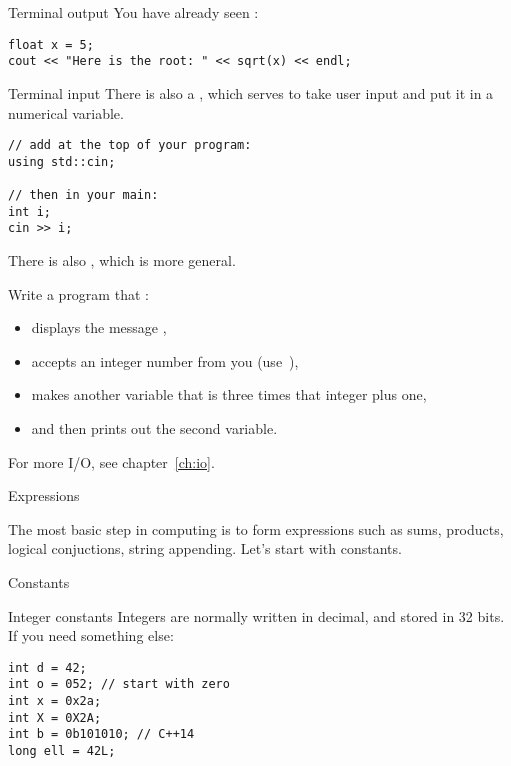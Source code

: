 \begin{block}{Terminal output}
  \label{sl:cout}
You have already seen :
\begin{lstlisting}
float x = 5;
cout << "Here is the root: " << sqrt(x) << endl;
\end{lstlisting}
\end{block}

\begin{block}{Terminal input}
  \label{sl:cin}
  There is also a , which serves to take user input and
  put it in a numerical variable.
\begin{lstlisting}
// add at the top of your program:
using std::cin;

// then in your main:
int i;
cin >> i;
\end{lstlisting}
There is also , which is more general.
\end{block}

\begin{exercise}
  \label{ex:cin-cout3np1}
  Write a program that :
  \begin{itemize}
  \item displays the message ,
  \item accepts an integer number from you (use~),
  \item makes another variable that is three times that integer plus one,
  \item and then prints out the second variable.
  \end{itemize}
\end{exercise}

For more I/O, see chapter~\ref{ch:io}.

 {Expressions}
\label{sec:expr}

The most basic step in computing is to form expressions such as sums,
products, logical conjuctions, string appending. Let's start with
constants.

 {Constants}

\begin{block}{Integer constants}
  \label{sl:intvals}
  Integers are normally  written in decimal, and stored in 32 bits.
  If you need something else:
\begin{lstlisting}
int d = 42;
int o = 052; // start with zero
int x = 0x2a;
int X = 0X2A;
int b = 0b101010; // C++14
long ell = 42L;
\end{lstlisting}
\end{block}

